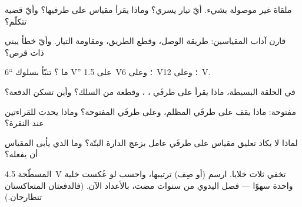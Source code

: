 \begin{exercise}[$\star$]\label{exo:g8:voltage-voltmeter:3}
 ملقاة غير موصولة بشيء. أيّ تيار يسري؟ وماذا يقرأ مقياس
 على طرفيها؟ وأيّ قضية تتكلّم؟
\end{exercise}

\begin{exercise}[$\star$]\label{exo:g8:voltage-voltmeter:4}
قارن آداب المقياسين: طريقة الوصل، وقطع الطريق، ومقاومة
التيار. وأيّ خطأ يبني  ذات قرص؟
\end{exercise}

\begin{exercise}[$\star$]\label{exo:g8:voltage-voltmeter:5}
ما ؟ تنبّأ بسلوك  ``6 V'' على \qty{1.5}{V}؛
وعلى \qty{6}{V}؛ وعلى \qty{12}{V}.
\end{exercise}

\begin{exercise}[$\star$]\label{exo:g8:voltage-voltmeter:6}
في الحلقة البسيطة، ماذا يقرأ  على طرفَي ،
، وقطعة من السلك؟ وأين تسكن الدفعة؟
\end{exercise}

\begin{exercise}[$\star$]\label{exo:g8:voltage-voltmeter:7}
 مفتوحة: ماذا يقف على طرفَي  المظلم، وعلى طرفَي
 المفتوحة؟ وماذا يحدث للقراءتين عند النقرة؟
\end{exercise}

\begin{exercise}[$\star$]\label{exo:g8:voltage-voltmeter:8}
لماذا لا يكاد تعليق مقياس  على طرفَي  عامل يزعج
الدارة البتّة؟ وما الذي يأبى المقياس أن يفعله؟
\end{exercise}

\begin{exercise}[$\star\star$]\label{exo:g8:voltage-voltmeter:9}
 المسطّحة \qty{4.5}{V} تخفي ثلاث خلايا. ارسم (أو صِف)
ترتيبها، واحسب  لو عُكست خلية واحدة سهوًا --- فصل
 اليدوي من سنوات مضت، بالأعداد الآن. (فالدفعتان
المتعاكستان تتطارحان.)
\end{exercise}

